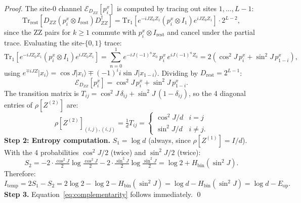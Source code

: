 \documentclass[12pt,a4paper]{article}
\begin{document}
\begin{proof}
The site-0 channel $\mathcal{E}_{D_{ZZ}}[p_i^x]$ is computed by tracing out sites $1,\ldots,L-1$:
\begin{equation}
  \mathrm{Tr}_\mathrm{rest}[D_{ZZ}(p_i^x\otimes I_\mathrm{rest})D_{ZZ}^\dagger]
  = \mathrm{Tr}_1[e^{-iJZ_0Z_1}(p_i^x\otimes I_1)e^{iJZ_0Z_1}]\cdot 2^{L-2},
\end{equation}
since the ZZ pairs for $k\ge 1$ commute with $p_i^x\otimes I_\mathrm{rest}$ and
cancel under the partial trace.  Evaluating the site-$\{0,1\}$ trace:
\begin{equation}
  \mathrm{Tr}_1[e^{-iJZ_0Z_1}(p_i^x\otimes I_1)e^{iJZ_0Z_1}]
  = \sum_{n=0}^{1} e^{-iJ(-1)^nZ_0}\,p_i^x\,e^{iJ(-1)^nZ_0}
  = 2(\cos^2\!J\, p_i^x + \sin^2\!J\, p_{1-i}^x),
\end{equation}
using $e^{\mp iJZ}|x_i\rangle = \cos J|x_i\rangle \mp (-1)^i i\sin J|x_{1-i}\rangle$.
Dividing by $D_\mathrm{rest}=2^{L-1}$:
\begin{equation}
  \mathcal{E}_{D_{ZZ}}[p_i^x] = \cos^2\!J\, p_i^x + \sin^2\!J\, p_{1-i}^x.
\end{equation}
The transition matrix is $T_{ij} = \cos^2\!J\,\delta_{ij} + \sin^2\!J\,(1-\delta_{ij})$,
so the 4 diagonal entries of $\rho[Z^{(2)}]$ are:
\begin{equation}
  \rho[Z^{(2)}]_{(i,j),(i,j)} = \tfrac{1}{d}T_{ij}
  = \begin{cases}\cos^2\!J/d & i=j \\ \sin^2\!J/d & i\ne j.\end{cases}
\end{equation}
\textbf{Step 2: Entropy computation.}
$S_1 = \log d$ (always, since $\rho[Z^{(1)}] = I/d$).
With the 4 probabilities $\cos^2\!J/2$ (twice) and $\sin^2\!J/2$ (twice):
\begin{equation}
  S_2 = -2\cdot\tfrac{\cos^2\!J}{2}\log\tfrac{\cos^2\!J}{2}
        -2\cdot\tfrac{\sin^2\!J}{2}\log\tfrac{\sin^2\!J}{2}
  = \log 2 + H_\mathrm{bin}(\sin^2\!J).
\end{equation}
Therefore:
\begin{equation}
  I_\mathrm{temp} = 2S_1 - S_2 = 2\log 2 - \log 2 - H_\mathrm{bin}(\sin^2\!J)
  = \log d - H_\mathrm{bin}(\sin^2\!J) = \log d - E_\mathrm{op}.
\end{equation}
\textbf{Step 3.}
Equation~\eqref{eq:complementarity} follows immediately. \qed
\end{proof}
\end{document}
